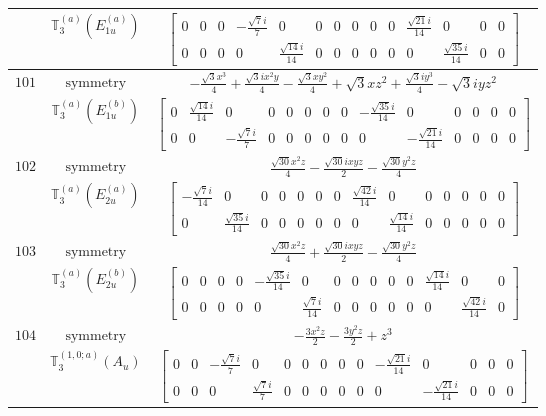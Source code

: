\documentclass[fleqn,8pt,landscape]{jsarticle}
\begin{document}
\begin{longtable}{ccc}
$  $ & $ \mathbb{T}_{3}^{(a)}(E_{1u}^{(a)}) $ & $ \begin{bmatrix} 0 & 0 & 0 & - \frac{\sqrt{7} i}{7} & 0 & 0 & 0 & 0 & 0 & 0 & \frac{\sqrt{21} i}{14} & 0 & 0 & 0 \\ 0 & 0 & 0 & 0 & \frac{\sqrt{14} i}{14} & 0 & 0 & 0 & 0 & 0 & 0 & \frac{\sqrt{35} i}{14} & 0 & 0 \end{bmatrix} $ \\ \hline
$ 101 $ & $ \text{symmetry} $ & $ - \frac{\sqrt{3} x^{3}}{4} + \frac{\sqrt{3} i x^{2} y}{4} - \frac{\sqrt{3} x y^{2}}{4} + \sqrt{3} x z^{2} + \frac{\sqrt{3} i y^{3}}{4} - \sqrt{3} i y z^{2} $ \\
$  $ & $ \mathbb{T}_{3}^{(a)}(E_{1u}^{(b)}) $ & $ \begin{bmatrix} 0 & \frac{\sqrt{14} i}{14} & 0 & 0 & 0 & 0 & 0 & 0 & - \frac{\sqrt{35} i}{14} & 0 & 0 & 0 & 0 & 0 \\ 0 & 0 & - \frac{\sqrt{7} i}{7} & 0 & 0 & 0 & 0 & 0 & 0 & - \frac{\sqrt{21} i}{14} & 0 & 0 & 0 & 0 \end{bmatrix} $ \\ \hline
$ 102 $ & $ \text{symmetry} $ & $ \frac{\sqrt{30} x^{2} z}{4} - \frac{\sqrt{30} i x y z}{2} - \frac{\sqrt{30} y^{2} z}{4} $ \\
$  $ & $ \mathbb{T}_{3}^{(a)}(E_{2u}^{(a)}) $ & $ \begin{bmatrix} - \frac{\sqrt{7} i}{14} & 0 & 0 & 0 & 0 & 0 & 0 & \frac{\sqrt{42} i}{14} & 0 & 0 & 0 & 0 & 0 & 0 \\ 0 & \frac{\sqrt{35} i}{14} & 0 & 0 & 0 & 0 & 0 & 0 & \frac{\sqrt{14} i}{14} & 0 & 0 & 0 & 0 & 0 \end{bmatrix} $ \\ \hline
$ 103 $ & $ \text{symmetry} $ & $ \frac{\sqrt{30} x^{2} z}{4} + \frac{\sqrt{30} i x y z}{2} - \frac{\sqrt{30} y^{2} z}{4} $ \\
$  $ & $ \mathbb{T}_{3}^{(a)}(E_{2u}^{(b)}) $ & $ \begin{bmatrix} 0 & 0 & 0 & 0 & - \frac{\sqrt{35} i}{14} & 0 & 0 & 0 & 0 & 0 & 0 & \frac{\sqrt{14} i}{14} & 0 & 0 \\ 0 & 0 & 0 & 0 & 0 & \frac{\sqrt{7} i}{14} & 0 & 0 & 0 & 0 & 0 & 0 & \frac{\sqrt{42} i}{14} & 0 \end{bmatrix} $ \\ \hline
$ 104 $ & $ \text{symmetry} $ & $ - \frac{3 x^{2} z}{2} - \frac{3 y^{2} z}{2} + z^{3} $ \\
$  $ & $ \mathbb{T}_{3}^{(1,0;a)}(A_{u}) $ & $ \begin{bmatrix} 0 & 0 & - \frac{\sqrt{7} i}{7} & 0 & 0 & 0 & 0 & 0 & 0 & - \frac{\sqrt{21} i}{14} & 0 & 0 & 0 & 0 \\ 0 & 0 & 0 & \frac{\sqrt{7} i}{7} & 0 & 0 & 0 & 0 & 0 & 0 & - \frac{\sqrt{21} i}{14} & 0 & 0 & 0 \end{bmatrix} $ \\ \hline

\end{longtable}
\end{document}
